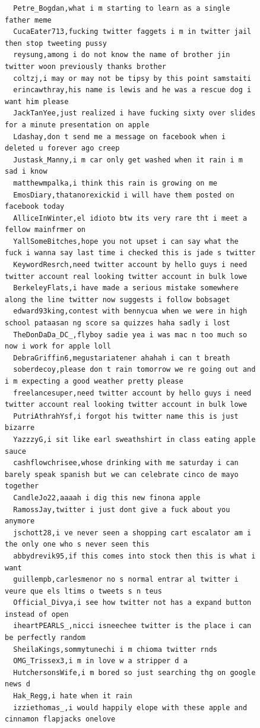 \begin{figure}[htpb]
\begin{verbatim}
  Petre_Bogdan,what i m starting to learn as a single father meme
  CucaEater713,fucking twitter faggets i m in twitter jail then stop tweeting pussy
  reysung,among i do not know the name of brother jin twitter woon previously thanks brother
  coltzj,i may or may not be tipsy by this point samstaiti
  erincawthray,his name is lewis and he was a rescue dog i want him please
  JackTanYee,just realized i have fucking sixty over slides for a minute presentation on apple
  Ldashay,don t send me a message on facebook when i deleted u forever ago creep
  Justask_Manny,i m car only get washed when it rain i m sad i know
  matthewmpalka,i think this rain is growing on me
  EmosDiary,thatanorexickid i will have them posted on facebook today
  AlliceInWinter,el idioto btw its very rare tht i meet a fellow mainfrmer on
  YallSomeBitches,hope you not upset i can say what the fuck i wanna say last time i checked this is jade s twitter
  KeywordResrch,need twitter account by hello guys i need twitter account real looking twitter account in bulk lowe
  BerkeleyFlats,i have made a serious mistake somewhere along the line twitter now suggests i follow bobsaget
  edward93king,contest with bennycua when we were in high school pataasan ng score sa quizzes haha sadly i lost
  TheDonDaDa_DC_,flyboy sadie yea i was mac n too much so now i work for apple loll
  DebraGriffin6,megustariatener ahahah i can t breath
  soberdecoy,please don t rain tomorrow we re going out and i m expecting a good weather pretty please
  freelancesuper,need twitter account by hello guys i need twitter account real looking twitter account in bulk lowe
  PutriAthrahYsf,i forgot his twitter name this is just bizarre
  YazzzyG,i sit like earl sweathshirt in class eating apple sauce
  cashflowchrisee,whose drinking with me saturday i can barely speak spanish but we can celebrate cinco de mayo together
  CandleJo22,aaaah i dig this new finona apple
  RamossJay,twitter i just dont give a fuck about you anymore
  jschott28,i ve never seen a shopping cart escalator am i the only one who s never seen this
  abbydrevik95,if this comes into stock then this is what i want
  guillempb,carlesmenor no s normal entrar al twitter i veure que els ltims o tweets s n teus
  Official_Divya,i see how twitter not has a expand button instead of open
  iheartPEARLS_,nicci isneechee twitter is the place i can be perfectly random
  SheilaKings,sommytunechi i m chioma twitter rnds
  OMG_Trissex3,i m in love w a stripper d a
  HutchersonsWife,i m bored so just searching thg on google news d
  Hak_Regg,i hate when it rain
  izziethomas_,i would happily elope with these apple and cinnamon flapjacks onelove

\end{verbatim}
\end{figure}
